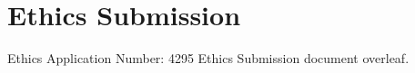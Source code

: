 \chapter{Ethics Submission}

Ethics Application Number: 4295
\newline
Ethics Submission document overleaf.
